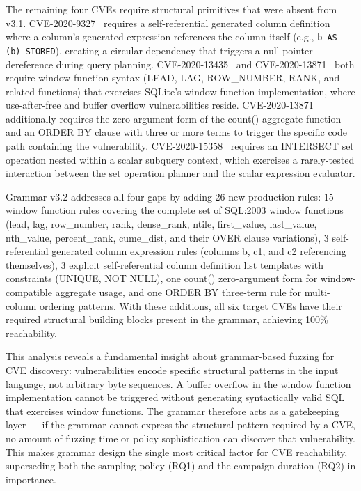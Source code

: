 The remaining four CVEs require structural primitives that were absent from v3.1. CVE-2020-9327~\cite{cve20209327} requires a self-referential generated column definition where a column's generated expression references the column itself (e.g., \texttt{b AS (b) STORED}), creating a circular dependency that triggers a null-pointer dereference during query planning. CVE-2020-13435~\cite{cve202013435} and CVE-2020-13871~\cite{cve202013871} both require window function syntax (LEAD, LAG, ROW\_NUMBER, RANK, and related functions) that exercises SQLite's window function implementation, where use-after-free and buffer overflow vulnerabilities reside. CVE-2020-13871 additionally requires the zero-argument form of the count() aggregate function and an ORDER BY clause with three or more terms to trigger the specific code path containing the vulnerability. CVE-2020-15358~\cite{cve202015358} requires an INTERSECT set operation nested within a scalar subquery context, which exercises a rarely-tested interaction between the set operation planner and the scalar expression evaluator.

Grammar v3.2 addresses all four gaps by adding 26 new production rules: 15 window function rules covering the complete set of SQL:2003 window functions (lead, lag, row\_number, rank, dense\_rank, ntile, first\_value, last\_value, nth\_value, percent\_rank, cume\_dist, and their OVER clause variations), 3 self-referential generated column expression rules (columns b, c1, and c2 referencing themselves), 3 explicit self-referential column definition list templates with constraints (UNIQUE, NOT NULL), one count() zero-argument form for window-compatible aggregate usage, and one ORDER BY three-term rule for multi-column ordering patterns. With these additions, all six target CVEs have their required structural building blocks present in the grammar, achieving 100\% reachability.

This analysis reveals a fundamental insight about grammar-based fuzzing for CVE discovery: vulnerabilities encode specific structural patterns in the input language, not arbitrary byte sequences. A buffer overflow in the window function implementation cannot be triggered without generating syntactically valid SQL that exercises window functions. The grammar therefore acts as a gatekeeping layer --- if the grammar cannot express the structural pattern required by a CVE, no amount of fuzzing time or policy sophistication can discover that vulnerability. This makes grammar design the single most critical factor for CVE reachability, superseding both the sampling policy (RQ1) and the campaign duration (RQ2) in importance.


